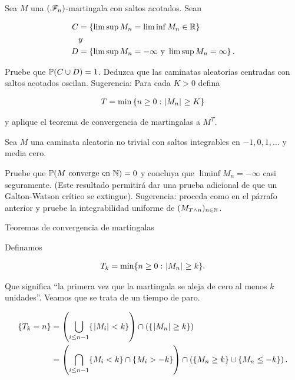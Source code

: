 \begin{problema}
    Sea $M$ una $\left( \mathscr{F}_n\right) $-martingala con saltos acotados. Sean

    \begin{align}
    C   &=  \left\{ \limsup M_n=\liminf M_n\in\mathbb{R}\right\}                  \\
        &y                                                      \\
    D   &=  \left\{ \limsup M_n=-\infty\text{ y }\limsup M_n=\infty\right\} .
    \end{align}\pn

    Pruebe que $\mathbb{P}\! \left( C\cup D \right)=1$. Deduzca que las caminatas aleatorias centradas 
    con saltos acotados oscilan. Sugerencia: Para cada $K>0$ defina

    \begin{align}
    T=\min\left\{ n\geq 0: \hspace{.25mm}\left|M_n\right|\hspace{.25mm}\geq K\right\} 
    \end{align}

    y aplique el teorema de convergencia de martingalas a $M^T$.\pn

    Sea $M$ una caminata aleatoria no trivial con saltos integrables en 
    $-1,0,1,\ldots$ y  media cero.\pn 

    Pruebe que $\mathbb{P}\! \left( M\text{ converge en }\mathbb{N} \right)=0$ y  concluya que $\liminf M_n=-\infty$ 
    casi seguramente. (Este resultado permitir\'a dar una prueba adicional de que un Galton-Watson cr\'itico se extingue).  
    Sugerencia: proceda como en el párrafo anterior y pruebe la integrabilidad uniforme de $(M_{T\wedge n})_{n \in \mathbb{N}}$.

     Teoremas de convergencia de martingalas
\end{problema}

\afterstatement\pn

Definamos 

\begin{align}
    T_k = \min\{ n \geq 0 : \hspace{.25mm}\left|M_n\right|\hspace{.25mm} \geq k \}.
\end{align}

Que significa ``la primera vez que la martingala se aleja de cero al menos $k$ unidades''. 
Veamos que se trata de un tiempo de paro.


\begin{align}
    \{ T_k = n \}   &=  \left( \bigcup_{i \leq n-1} \{ \hspace{.25mm}\left|M_i\right|\hspace{.25mm} < k \}\right)  \cap \left( \{ \hspace{.25mm}\left|M_n\right|\hspace{.25mm} \geq k \}\right)                                  \\
                    &=  \left( \bigcap_{i \leq n-1} \{ M_i < k \} \cap \{ M_i > -k \}\right)  \cap \left( \{ M_n \geq k \} \cup \{ M_n \leq -k \}\right) .
\end{align}\pn

